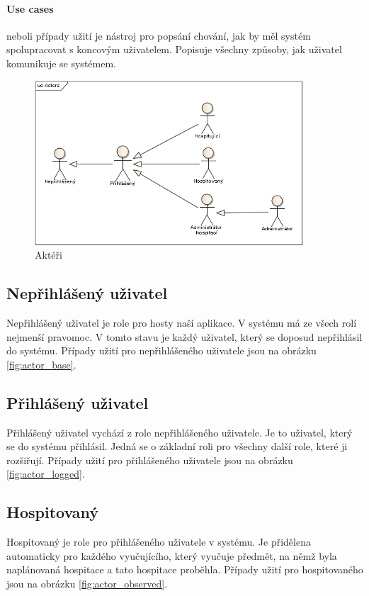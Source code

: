 \paragraph*{Use cases}
neboli případy užití je nástroj pro popsání chování, jak by měl systém spolupracovat s koncovým uživatelem. Popisuje všechny způsoby, jak uživatel komunikuje se systémem.

\begin{figure}[H]
\begin{center}
\includegraphics[width=10cm]{figures/Actors}
\caption{Aktéři}
\label{fig:actors}
\end{center}
\end{figure}

\subsection{Nepřihlášený uživatel}
Nepřihlášený uživatel je role pro hosty naší aplikace. V systému má ze všech rolí nejmenší pravomoc. V tomto stavu je každý uživatel, který se doposud nepřihlásil do systému. Případy užití pro nepřihlášeného uživatele jsou na obrázku \ref{fig:actor_base}.

\subsection{Přihlášený uživatel}
Přihlášený uživatel vychází z role nepřihlášeného uživatele. Je to uživatel, který se do systému přihlásil. Jedná se o základní roli pro všechny další role, které ji rozšiřují. Případy užití pro přihlášeného uživatele jsou na obrázku \ref{fig:actor_logged}.

\subsection{Hospitovaný}
Hospitovaný je role pro přihlášeného uživatele v systému. Je přidělena automaticky pro každého vyučujícího, který vyučuje předmět, na němž byla naplánovaná hospitace a tato hospitace proběhla. Případy užití pro hospitovaného jsou na obrázku \ref{fig:actor_observed}.

